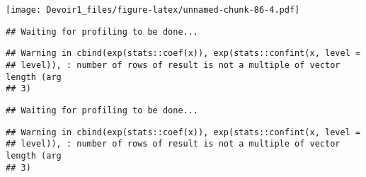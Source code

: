 \documentclass[]{article}
\newenvironment{Shaded}{\begin{snugshade}}{\end{snugshade}}
\newcommand{\KeywordTok}[1]{\textcolor[rgb]{0.13,0.29,0.53}{\textbf{#1}}}
\newcommand{\DataTypeTok}[1]{\textcolor[rgb]{0.13,0.29,0.53}{#1}}
\newcommand{\DecValTok}[1]{\textcolor[rgb]{0.00,0.00,0.81}{#1}}
\newcommand{\StringTok}[1]{\textcolor[rgb]{0.31,0.60,0.02}{#1}}
\newcommand{\OperatorTok}[1]{\textcolor[rgb]{0.81,0.36,0.00}{\textbf{#1}}}
\newcommand{\NormalTok}[1]{#1}
\begin{document}
\texttt{[image: Devoir1\_files/figure-latex/unnamed-chunk-86-4.pdf]}

\begin{Shaded}
\end{Shaded}

\begin{verbatim}
## Waiting for profiling to be done...
\end{verbatim}

\begin{verbatim}
## Warning in cbind(exp(stats::coef(x)), exp(stats::confint(x, level =
## level)), : number of rows of result is not a multiple of vector length (arg
## 3)
\end{verbatim}

\begin{verbatim}
## Waiting for profiling to be done...
\end{verbatim}

\begin{verbatim}
## Warning in cbind(exp(stats::coef(x)), exp(stats::confint(x, level =
## level)), : number of rows of result is not a multiple of vector length (arg
## 3)
\end{verbatim}
\end{document}
